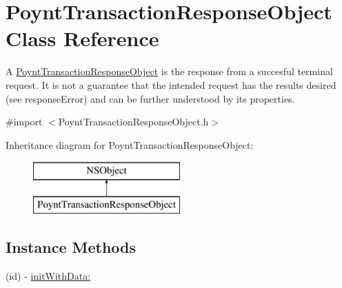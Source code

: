 \hypertarget{interface_poynt_transaction_response_object}{}\section{Poynt\+Transaction\+Response\+Object Class Reference}
\label{interface_poynt_transaction_response_object}


A \hyperlink{interface_poynt_transaction_response_object}{Poynt\+Transaction\+Response\+Object} is the response from a succesful terminal request. It is not a guarantee that the intended request has the results desired (see {\ttfamily response\+Error}) and can be further understood by its properties.  




{\ttfamily \#import $<$Poynt\+Transaction\+Response\+Object.\+h$>$}

Inheritance diagram for Poynt\+Transaction\+Response\+Object\+:\begin{figure}[H]
\begin{center}
\leavevmode
\includegraphics[height=2.000000cm]{interface_poynt_transaction_response_object}
\end{center}
\end{figure}
\subsection*{Instance Methods}
\begin{DoxyCompactItemize}
\item 
(id) -\/ \hyperlink{interface_poynt_transaction_response_object_a42ee83b8c11bd68e673b38d2a96ca170}{init\+With\+Data\+:}
\end{DoxyCompactItemize}
